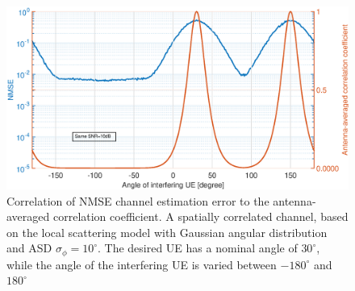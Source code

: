 \begin{figure}[t!]
	\centering
	\includegraphics[width=1.0\linewidth]{figures/NMSE_correlation.eps}
	\caption{Correlation of NMSE channel estimation error to the antenna-averaged correlation coefficient. A spatially correlated channel, based on
the local scattering model with Gaussian angular distribution and ASD $ \sigma_\phi= 10^\circ$. The desired UE has a nominal angle of $30^\circ$, while the angle of the interfering UE
is varied between $-180^\circ$ and $180^\circ$}
	\label{fig:channel_correlation_model}
\end{figure}














